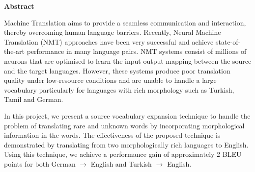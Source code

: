 \begin{center}
	\textbf{Abstract}
\end{center} 

Machine Translation aims to provide a seamless communication and interaction,  thereby overcoming human language barriers. Recently, Neural Machine Translation (NMT) approaches have been very successful and achieve state-of-the-art performance in many language pairs. NMT systems consist of millions of neurons that are optimised to learn the input-output mapping between the source and the target languages. However, these systems produce poor translation quality under low-resource conditions and are unable to handle a large vocabulary particularly for languages with rich morphology such as Turkish, Tamil and German.

In this project, we present a source vocabulary expansion technique to handle the problem of translating rare and unknown words by incorporating morphological information in the words. The effectiveness of the proposed technique is demonstrated by translating from two morphologically rich languages to English. Using this technique, we achieve a performance gain of approximately 2 BLEU points for both German $\rightarrow$ English and Turkish $\rightarrow$ English. 